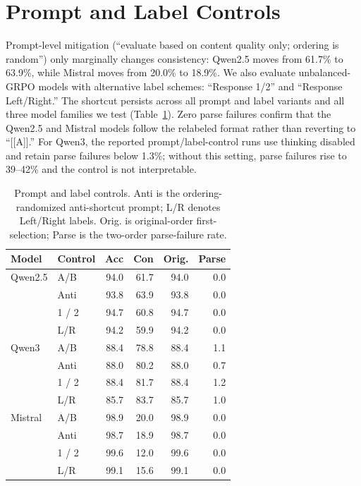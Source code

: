 \documentclass[letterpaper]{article}
\newcommand{\multirow}[3]{#3}
\begin{document}
\section{Prompt and Label Controls}
\label{app:label_controls}

Prompt-level mitigation (``evaluate based on content quality only; ordering is random'') only marginally changes consistency: Qwen2.5 moves from 61.7\% to 63.9\%, while Mistral moves from 20.0\% to 18.9\%. We also evaluate unbalanced-GRPO models with alternative label schemes: ``Response 1/2'' and ``Response Left/Right.'' The shortcut persists across all prompt and label variants and all three model families we test (Table~\ref{tab:labels-app}). Zero parse failures confirm that the Qwen2.5 and Mistral models follow the relabeled format rather than reverting to ``[[A]].'' For Qwen3, the reported prompt/label-control runs use thinking disabled and retain parse failures below 1.3\%; without this setting, parse failures rise to 39--42\% and the control is not interpretable.

\begin{table}[H]
\centering
\scriptsize
\setlength{\tabcolsep}{3pt}
\begin{tabular}{@{}llrrrr@{}}
\toprule
\textbf{Model} & \textbf{Control} & \textbf{Acc} & \textbf{Con} & \textbf{Orig.} & \textbf{Parse} \\
\midrule
\multirow{4}{*}{Qwen2.5} & A/B & 94.0 & 61.7 & 94.0 & 0.0 \\
& Anti & 93.8 & 63.9 & 93.8 & 0.0 \\
& 1 / 2 & 94.7 & 60.8 & 94.7 & 0.0 \\
& L/R & 94.2 & 59.9 & 94.2 & 0.0 \\
\midrule
\multirow{4}{*}{Qwen3} & A/B & 88.4 & 78.8 & 88.4 & 1.1 \\
& Anti & 88.0 & 80.2 & 88.0 & 0.7 \\
& 1 / 2 & 88.4 & 81.7 & 88.4 & 1.2 \\
& L/R & 85.7 & 83.7 & 85.7 & 1.0 \\
\midrule
\multirow{4}{*}{Mistral} & A/B & 98.9 & 20.0 & 98.9 & 0.0 \\
& Anti & 98.7 & 18.9 & 98.7 & 0.0 \\
& 1 / 2 & 99.6 & 12.0 & 99.6 & 0.0 \\
& L/R & 99.1 & 15.6 & 99.1 & 0.0 \\
\bottomrule
\end{tabular}
\caption{Prompt and label controls. Anti is the ordering-randomized anti-shortcut prompt; L/R denotes Left/Right labels. Orig. is original-order first-selection; Parse is the two-order parse-failure rate.}
\label{tab:labels-app}
\end{table}
\end{document}
